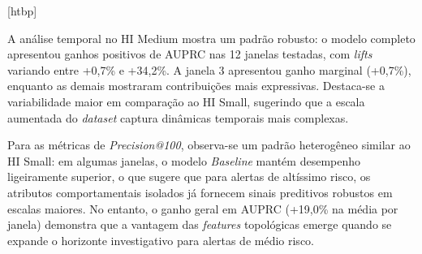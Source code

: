 \documentclass[a4paper,12pt,oneside,onecolumn,final,fleqn]{repUERJ}
\makeatletter
\renewenvironment{table}[1][htbp]
  {\@float{table}[#1]\centering}
  {\end@float}
\makeatother
\begin{document}
\begin{table}
    \centering
    \caption{Comparação de desempenho por janela temporal (HI Medium - seleção)}
    \label{tab:window-comparison-medium}
\end{table}

A análise temporal no HI Medium mostra um padrão robusto: o modelo completo apresentou ganhos positivos de AUPRC nas 12 janelas testadas, com \textit{lifts} variando entre +0,7\% e +34,2\%. A janela 3 apresentou ganho marginal (+0,7\%), enquanto as demais mostraram contribuições mais expressivas. Destaca-se a variabilidade maior em comparação ao HI Small, sugerindo que a escala aumentada do \textit{dataset} captura dinâmicas temporais mais complexas.

Para as métricas de \textit{Precision@100}, observa-se um padrão heterogêneo similar ao HI Small: em algumas janelas, o modelo \textit{Baseline} mantém desempenho ligeiramente superior, o que sugere que para alertas de altíssimo risco, os atributos comportamentais isolados já fornecem sinais preditivos robustos em escalas maiores. No entanto, o ganho geral em AUPRC (+19,0\% na média por janela) demonstra que a vantagem das \textit{features} topológicas emerge quando se expande o horizonte investigativo para alertas de médio risco.
\end{document}
